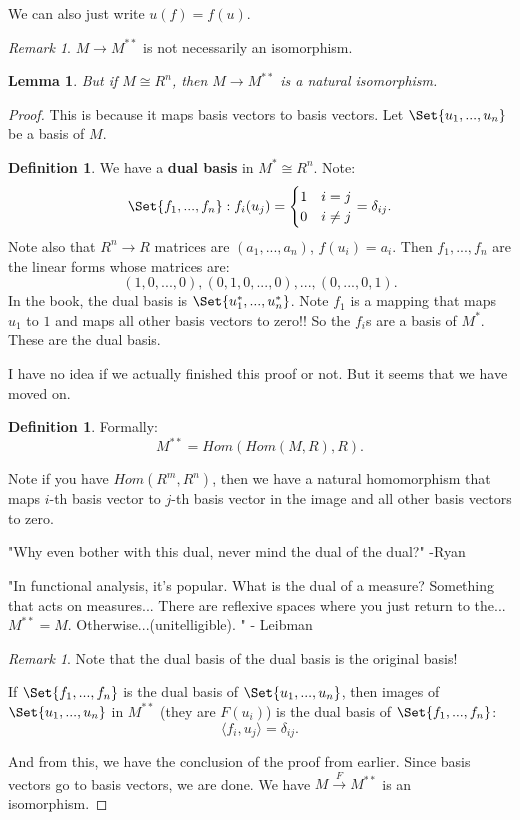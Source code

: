 \documentclass[9pt,reqno,twoside]{amsbook}
\theoremstyle{plain}
\numberwithin{section}{chapter}
\numberwithin{equation}{chapter}
\newtheorem{lem}[theorem]{Lemma}
\theoremstyle{definition}
\newtheorem{Def}[theorem]{Definition}
\theoremstyle{remark}
\newtheorem{rem}[theorem]{Remark}
\theoremstyle{plain}
\begin{document}
We can also just write $u(f) = f(u)$. 

\begin{rem}
$M \to M^{**}$ is not necessarily an isomorphism. 
\end{rem}

\begin{lem}
But if $M \cong R^n$, then $M \to M^{**}$ is a natural isomorphism. 
\end{lem}
\begin{proof}
This is because it maps basis vectors to basis vectors. Let $\Set{u_1,...,u_n}$ be a basis of $M$. 

\begin{Def}
We have a \textbf{dual basis} in $M^* \cong R^n$. Note:
$$
\Set{f_1,...,f_n}:f_i(u_j) = \begin{cases}
1 & i = j\\
0 & i \neq j
\end{cases} = \delta_{ij}.
$$
Note also that $R^n \to R$ matrices are $(a_1,...,a_n)$, $f(u_i) = a_i$. Then $f_1,...,f_n$ are the linear forms whose matrices are:
$$
(1,0,...,0),(0,1,0,...,0),...,(0,...,0,1).
$$
In the book, the dual basis is $\Set{u_1^*,...,u_n^*}$. Note $f_1$ is a mapping that maps $u_1$ to $1$ and maps all other basis vectors to zero!! So the $f_i$s are a basis of $M^*$. These are the dual basis. 
\end{Def}
I have no idea if we actually finished this proof or not. But it seems that we have moved on. 


\begin{Def}
Formally: 
$$
M^{**} = Hom(Hom(M,R),R).
$$
\end{Def}

Note if you have $Hom(R^m,R^n)$, then we have a natural homomorphism that maps $i$-th basis vector to $j$-th basis vector in the image and all other basis vectors to zero. 

"Why even bother with this dual, never mind the dual of the dual?" -Ryan

"In functional analysis, it's popular. What is the dual of a measure? Something that acts on measures... There are reflexive spaces where you just return to the... $M^{**} = M$. Otherwise...(unitelligible). " - Leibman

\begin{rem}
Note that the dual basis of the dual basis is the original basis!

If $\Set{f_1,...,f_n}$ is the dual basis of $\Set{u_1,...,u_n}$, then images of $\Set{u_1,...,u_n}$ in $M^{**}$ (they are $F(u_i)$) is the dual basis of $\Set{f_1,...,f_n}$:
$$
\langle f_i,u_j\rangle = \delta_{ij}.
$$
\end{rem}

And from this, we have the conclusion of the proof from earlier. Since basis vectors go to basis vectors, we are done. We have $M \overset{F}{\to} M^{**}$ is an isomorphism. 
\end{proof}
\end{document}
